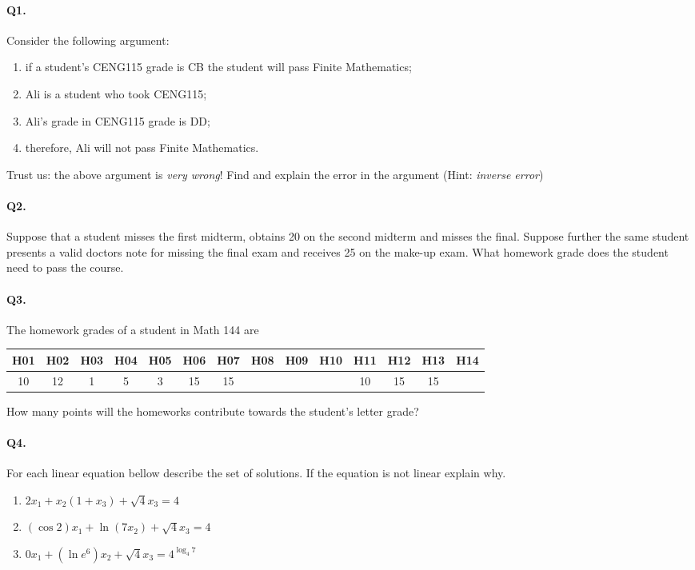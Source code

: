 \documentclass[11pt]{article}
\begin{document}
\pagestyle{myheadings}

\paragraph{Q1.} Consider the following argument:
\begin{enumerate}
\item if a student's CENG115 grade is CB the student will pass Finite Mathematics;
\item Ali is a student who took CENG115;
\item Ali's grade in CENG115 grade is DD;
\item therefore, Ali will not pass Finite Mathematics.
\end{enumerate}
Trust us: the above argument is \emph{very wrong}! Find and explain the error
in the argument (Hint: \emph{inverse error})

\paragraph{Q2.} Suppose that a student misses the first midterm, obtains 20 on
the second midterm and misses the final. Suppose further the same student
presents a valid doctors note for missing the final exam and receives 25 on
the make-up exam. What homework grade does the student need to pass the
course.

\paragraph{Q3.} The homework grades of a student in Math 144 are
\begin{center}
\begin{tabular}{*{14}{c}}
H01 & H02 & H03 & H04 & H05 & H06 & H07 & H08 & H09 
	& H10 & H11 & H12 & H13 & H14
\\\hline
10 & 12 & 1 & 5 & 3 & 15 & 15 & & & & 10 & 15 & 15
\end{tabular}
\end{center}
How many points will the homeworks contribute towards the student's letter
grade?

\paragraph{Q4.} For each linear equation bellow describe the set of solutions.
If the equation is not linear explain why.
\begin{enumerate}
\item \(2 x_1 + x_2(1+x_3) + \sqrt{4}x_3= 4\)
\item \((\cos 2) x_1 + \ln (7x_2) + \sqrt{4}x_3= 4\)
\item \(0 x_1 + (\ln e^6) x_2 + \sqrt{4}x_3= 4^{\log_4 7}\)
\end{enumerate}
\end{document}
